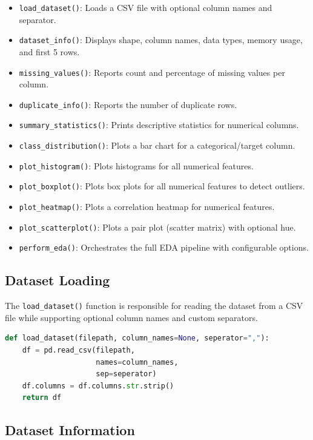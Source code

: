 \documentclass[12pt,a4paper]{article}
\begin{document}
\begin{itemize}
    \item \texttt{load\_dataset()}: Loads a CSV file with optional column names and separator.
    \item \texttt{dataset\_info()}: Displays shape, column names, data types, memory usage, and first 5 rows.
    \item \texttt{missing\_values()}: Reports count and percentage of missing values per column.
    \item \texttt{duplicate\_info()}: Reports the number of duplicate rows.
    \item \texttt{summary\_statistics()}: Prints descriptive statistics for numerical columns.
    \item \texttt{class\_distribution()}: Plots a bar chart for a categorical/target column.
    \item \texttt{plot\_histogram()}: Plots histograms for all numerical features.
    \item \texttt{plot\_boxplot()}: Plots box plots for all numerical features to detect outliers.
    \item \texttt{plot\_heatmap()}: Plots a correlation heatmap for numerical features.
    \item \texttt{plot\_scatterplot()}: Plots a pair plot (scatter matrix) with optional hue.
    \item \texttt{perform\_eda()}: Orchestrates the full EDA pipeline with configurable options.
\end{itemize}

\subsection{Dataset Loading}

The \texttt{load\_dataset()} function is responsible for reading the dataset
from a CSV file while supporting optional column names and custom separators.

\begin{lstlisting}[language=Python,caption={Dataset Loading Function}]
def load_dataset(filepath, column_names=None, seperator=","):
    df = pd.read_csv(filepath,
                     names=column_names,
                     sep=seperator)
    df.columns = df.columns.str.strip()
    return df
\end{lstlisting}


\subsection{Dataset Information}
\end{document}

